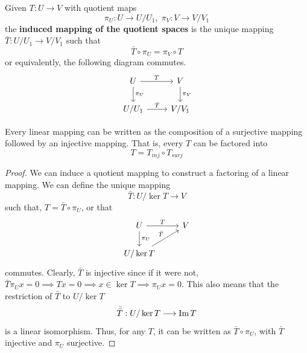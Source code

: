   \begin{definition}
    Given $T: U \longrightarrow V$ with quotient maps 
    \begin{equation}
      \pi_U: U \longrightarrow U / U_1, \; \pi_V: V \longrightarrow V / V_1
    \end{equation}
    the \textbf{induced mapping of the quotient spaces} is the unique mapping $\bar{T}: U/U_1 \longrightarrow V / V_1$ such that 
    \begin{equation}
      \bar{T} \circ \pi_U = \pi_V \circ T
    \end{equation}
    or equivalently, the following diagram commutes. 
    \[\begin{tikzcd}
        U \arrow{r}{T} \arrow{d}{\pi_U} & V \arrow{d}{\pi_V}\\
        U / U_1 \arrow{r}{\bar{T}} & V / V_1
    \end{tikzcd}\]
  \end{definition} 

  \begin{theorem}
    Every linear mapping can be written as the composition of a surjective mapping followed by an injective mapping. That is, every $T$ can be factored into 
    \begin{equation}
      T = T_{inj} \circ T_{surj}
    \end{equation}
  \end{theorem}
  \begin{proof}
    We can induce a quotient mapping to construct a factoring of a linear mapping. We can define the unique mapping 
    \begin{equation}
      \bar{T}: U / \ker{T} \longrightarrow V
    \end{equation}
    such that, $T = \bar{T} \circ \pi_U$, or that 
    \[\begin{tikzcd}
       U \arrow{r}{T} \arrow{d}{\pi_U} & V \\
       U / \ker{T} \arrow{ru}{\bar{T}}
    \end{tikzcd} \]
    commutes. Clearly, $\bar{T}$ is injective since if it were not, $\bar{T} \pi_U x = 0 \implies T x = 0 \implies x \in \ker{T} \implies \pi_U x = 0$. This also means that the restriction of $\bar{T}$ to $U / \ker{T}$
    \begin{equation}
      \bar{\bar{T}}: U / \ker{T} \longrightarrow \operatorname{Im}{T}
    \end{equation}
    is a linear isomorphism. Thus, for any $T$, it can be written as $\bar{T} \circ \pi_U$, with $\bar{T}$ injective and $\pi_U$ surjective. 
  \end{proof}

